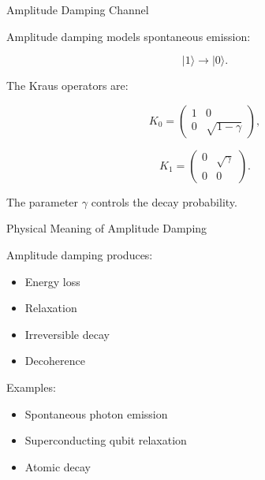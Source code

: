 \documentclass{beamer}
\begin{document}
\begin{frame}{Amplitude Damping Channel}

Amplitude damping models spontaneous emission:

\[
|1\rangle \rightarrow |0\rangle.
\]

\vspace{0.4cm}

The Kraus operators are:

\[
K_0
=
\begin{pmatrix}
1 & 0 \\
0 & \sqrt{1-\gamma}
\end{pmatrix},
\]

\[
K_1
=
\begin{pmatrix}
0 & \sqrt{\gamma} \\
0 & 0
\end{pmatrix}.
\]

\vspace{0.3cm}

The parameter \(\gamma\) controls the decay probability.

\end{frame}

\begin{frame}{Physical Meaning of Amplitude Damping}

Amplitude damping produces:

\begin{itemize}
    \item Energy loss
    \item Relaxation
    \item Irreversible decay
    \item Decoherence
\end{itemize}

\vspace{0.4cm}

Examples:
\begin{itemize}
    \item Spontaneous photon emission
    \item Superconducting qubit relaxation
    \item Atomic decay
\end{itemize}

\end{frame}
\end{document}
